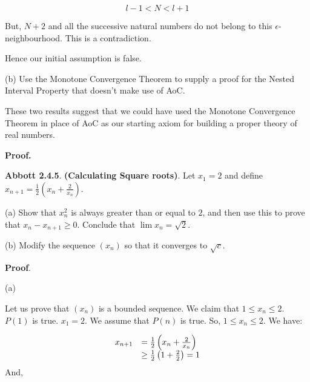 \documentclass[10pt]{article}
\begin{document}
\begin{equation*}
l-1< N< l+1
\end{equation*}




But, $\displaystyle N+2$ and all the successive natural numbers do not belong to this $\displaystyle \epsilon $-neighbourhood. This is a contradiction. 



Hence our initial assumption is false. 



(b) Use the Monotone Convergence Theorem to supply a proof for the Nested Interval Property that doesn't make use of AoC.



These two results suggest that we could have used the Monotone Convergence Theorem in place of AoC as our starting axiom for building a proper theory of real numbers.



\textbf{Proof.}



\textbf{Abbott 2.4.5}. \textbf{(Calculating Square roots)}. Let $\displaystyle x_{1} =2$ and define $\displaystyle x_{n+1} =\frac{1}{2}\left( x_{n} +\frac{2}{x_{n}}\right)$.



(a) Show that $\displaystyle x_{n}^{2}$ is always greater than or equal to $\displaystyle 2$, and then use this to prove that $\displaystyle x_{n} -x_{n+1} \geq 0$. Conclude that $\displaystyle \lim x_{n} =\sqrt{2}$. 



(b) Modify the sequence $\displaystyle ( x_{n})$ so that it converges to $\displaystyle \sqrt{c}$.



\textbf{Proof}.



(a) 

Let us prove that $\displaystyle ( x_{n})$ is a bounded sequence. We claim that $\displaystyle 1\leq x_{n} \leq 2$. $\displaystyle P( 1)$ is true. $\displaystyle x_{1} =2$. We assume that $\displaystyle P( n)$ is true. So, $\displaystyle 1\leq x_{n} \leq 2$. We have:


\begin{equation*}
\begin{array}{ c l }
x_{n+1} & =\frac{1}{2}\left( x_{n} +\frac{2}{x_{n}}\right)\\
 & \geq \frac{1}{2}\left( 1+\frac{2}{2}\right) =1
\end{array}
\end{equation*}
 And,
\end{document}
